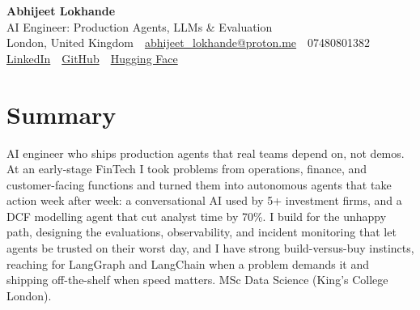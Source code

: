 \documentclass[10pt,a4paper]{article}
\newcommand{\sep}{\,\textcolor{accent!60}{\textbar}\,}
\begin{document}
\begin{center}
  {\fontsize{24}{26}\selectfont\bfseries Abhijeet Lokhande}\\[3pt]
  {\color{accent}\large AI Engineer: Production Agents, LLMs \& Evaluation}\\[5pt]
  {\small
    London, United Kingdom \sep
    \href{mailto:abhijeet_lokhande@proton.me}{abhijeet\_lokhande@proton.me} \sep
    07480801382 \\[2pt]
    \href{https://www.linkedin.com/in/ablds/}{LinkedIn} \sep
    \href{https://github.com/abhijeetscode}{GitHub} \sep
    \href{https://huggingface.co/ab-ai}{Hugging Face}
  }
\end{center}
\vspace{2pt}

\section{Summary}
AI engineer who ships production agents that real teams depend on, not demos. At an early-stage FinTech I took problems from operations, finance, and customer-facing functions and turned them into autonomous agents that take action week after week: a conversational AI used by 5+ investment firms, and a DCF modelling agent that cut analyst time by 70\%. I build for the unhappy path, designing the evaluations, observability, and incident monitoring that let agents be trusted on their worst day, and I have strong build-versus-buy instincts, reaching for LangGraph and LangChain when a problem demands it and shipping off-the-shelf when speed matters. MSc Data Science (King's College London).

\end{document}
